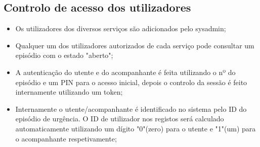 \subsection{Controlo de acesso dos utilizadores}
\begin{itemize}
	\item Os utilizadores dos diversos serviços são adicionados pelo sysadmin;
	\item Qualquer um dos utilizadores autorizados de cada serviço pode consultar um episódio com o estado "aberto";
	\item A autenticação do utente e do acompanhante é feita utilizando o nº do episódio e um PIN para o acesso inicial, depois o controlo da sessão é feito internamente utilizando um token;
	\item Internamente o utente/acompanhante é identificado no sistema pelo ID do episódio de urgência. O ID de utilizador nos registos será calculado automaticamente utilizando um dígito "0"(zero) para o utente e "1"(um) para o acompanhante respetivamente;
\end{itemize}



